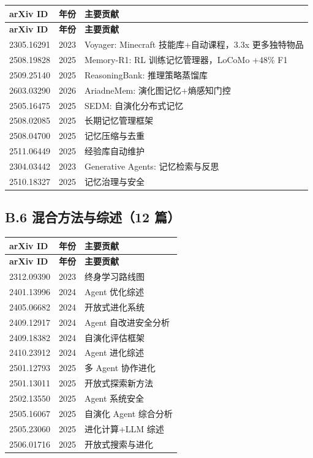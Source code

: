 \begin{longtable}{llp{7cm}}
\toprule
\textbf{arXiv ID} & \textbf{年份} & \textbf{主要贡献} \\
\midrule
\endfirsthead
\toprule
\textbf{arXiv ID} & \textbf{年份} & \textbf{主要贡献} \\
\midrule
\endhead
\bottomrule
\endlastfoot

2305.16291 & 2023 & Voyager: Minecraft 技能库+自动课程，3.3x 更多独特物品 \\
2508.19828 & 2025 & Memory-R1: RL 训练记忆管理器，LoCoMo +48\% F1 \\
2509.25140 & 2025 & ReasoningBank: 推理策略蒸馏库 \\
2603.03290 & 2026 & AriadneMem: 演化图记忆+熵感知门控 \\
2505.16475 & 2025 & SEDM: 自演化分布式记忆 \\
2508.02085 & 2025 & 长期记忆管理框架 \\
2508.04700 & 2025 & 记忆压缩与去重 \\
2511.06449 & 2025 & 经验库自动维护 \\
2304.03442 & 2023 & Generative Agents: 记忆检索与反思 \\
2510.18327 & 2025 & 记忆治理与安全 \\
\end{longtable}

\subsection*{B.6 混合方法与综述（12 篇）}

\begin{longtable}{llp{7cm}}
\toprule
\textbf{arXiv ID} & \textbf{年份} & \textbf{主要贡献} \\
\midrule
\endfirsthead
\toprule
\textbf{arXiv ID} & \textbf{年份} & \textbf{主要贡献} \\
\midrule
\endhead
\bottomrule
\endlastfoot

2312.09390 & 2023 & 终身学习路线图 \\
2401.13996 & 2024 & Agent 优化综述 \\
2405.06682 & 2024 & 开放式进化系统 \\
2409.12917 & 2024 & Agent 自改进安全分析 \\
2409.18382 & 2024 & 自演化评估框架 \\
2410.23912 & 2024 & Agent 进化综述 \\
2501.12793 & 2025 & 多 Agent 协作进化 \\
2501.13011 & 2025 & 开放式探索新方法 \\
2502.13550 & 2025 & Agent 系统安全 \\
2505.16067 & 2025 & 自演化 Agent 综合分析 \\
2505.23060 & 2025 & 进化计算+LLM 综述 \\
2506.01716 & 2025 & 开放式搜索与进化 \\
\end{longtable}

